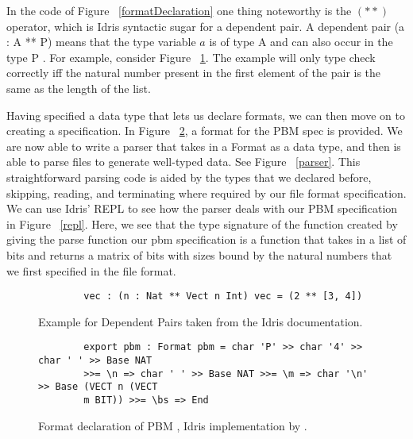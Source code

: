 In the code of Figure ~\ref{formatDeclaration} one thing noteworthy is the
$(**)$ operator, which is Idris syntactic sugar for a dependent pair. A
dependent pair (a : A ** P) means that the type variable $a$ is of type A and
can also occur in the type P \cite{idris_dependent_pairs}. For example, consider
Figure ~\ref{dependentPairExample}. The example will only type check correctly
iff the natural number present in the first element of the pair is the same as
the length of the list. 

Having specified a data type that lets us declare formats, we can then move on
to creating a specification. In Figure ~\ref{spec_declaration}, a format for the
PBM spec is provided. We are now able to write a parser that takes in a Format
as a data type, and then is able to parse files to generate well-typed data. See
Figure ~\ref{parser}. This straightforward parsing code is aided by the types
that we declared before, skipping, reading, and terminating where required by
our file format specification. We can use Idris' REPL to see how the parser
deals with our PBM specification in Figure ~\ref{repl}. Here, we see that the
type signature of the function created by giving the parse function our pbm
specification is a function that takes in a list of bits and returns a matrix of
bits with sizes bound by the natural numbers that we first specified in the file
format. 

\begin{figure}[h]
    \caption{Example for Dependent Pairs taken from the Idris documentation.}
    \label{dependentPairExample}
    \begin{lstlisting}
        vec : (n : Nat ** Vect n Int) vec = (2 ** [3, 4])
    \end{lstlisting}
\end{figure}

\begin{figure}[h]
    \caption{Format declaration of PBM \cite{power_of_pi}, Idris implementation
    by \cite{idris_pop}.}
    \label{spec_declaration}
    \begin{lstlisting}
        export pbm : Format pbm = char 'P' >> char '4' >> char ' ' >> Base NAT
        >>= \n => char ' ' >> Base NAT >>= \m => char '\n' >> Base (VECT n (VECT
        m BIT)) >>= \bs => End
    \end{lstlisting}
\end{figure}


